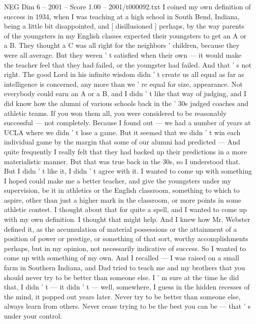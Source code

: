 \begin{textsample}{NEG Dim 6 – 2001 – Score 1.00 – 2001/t000092.txt}  \label{ex:f6_neg_055}
I coined my own definition of success in 1934, when I was teaching at a high school in South Bend, Indiana, being a little bit disappointed, and [ disillusioned ] perhaps, by the way parents of the youngsters in my English classes expected their youngsters to get an A or a B.
They thought a C was all right for the neighbors ' children, because they were all average.
But they weren ' t satisfied when their own — it would make the teacher feel that they had failed, or the youngster had failed.
And that ' s not right.
The good Lord in his infinite wisdom didn ' t create us all equal as far as intelligence is concerned, any more than we ' re equal for size, appearance.
Not everybody could earn an A or a B, and I didn ' t like that way of judging, and I did know how the alumni of various schools back in the ' 30s judged coaches and athletic teams.
If you won them all, you were considered to be reasonably successful — not completely.
Because I found out — we had a number of years at UCLA where we didn ' t lose a game.
But it seemed that we didn ' t win each individual game by the margin that some of our alumni had predicted — And quite frequently I really felt that they had backed up their predictions in a more materialistic manner.
But that was true back in the 30s, so I understood that.
But I didn ' t like it, I didn ' t agree with it.
I wanted to come up with something I hoped could make me a better teacher, and give the youngsters under my supervision, be it in athletics or the English classroom, something to which to aspire, other than just a higher mark in the classroom, or more points in some athletic contest.
I thought about that for quite a spell, and I wanted to come up with my own definition.
I thought that might help.
And I knew how Mr.
Webster defined it, as the accumulation of material possessions or the attainment of a position of power or prestige, or something of that sort, worthy accomplishments perhaps, but in my opinion, not necessarily indicative of success.
So I wanted to come up with something of my own.
And I recalled — I was raised on a small farm in Southern Indiana, and Dad tried to teach me and my brothers that you should never try to be better than someone else.
I ' m sure at the time he did that, I didn ' t — it didn ' t — well, somewhere, I guess in the hidden recesses of the mind, it popped out years later.
Never try to be better than someone else, always learn from others.
Never cease trying to be the best you can be — that ' s under your control.

\end{textsample}
